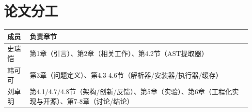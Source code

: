 \documentclass[10pt]{ctexart}
\begin{document}
\section*{论文分工}

\begin{table}[H]
\centering
\small
\begin{tabular}{@{}p{2.0cm} p{9.5cm}@{}}
\toprule
成员 & 负责章节 \\
\midrule
史瑞恺 & 第1章（引言）、第2章（相关工作）、第4.2节（AST提取器） \\
\hline
韩可可 & 第3章（问题定义）、第4.3-4.6节（解析器/安装器/执行器/缓存） \\
\hline
刘卓明 & 第4.1/4.7/4.8节（架构/创新/反馈）、第5章（实验）、第6章（工程化实现与开源）、第7-8章（讨论/结论） \\
\bottomrule
\end{tabular}
\end{table}
\end{document}
